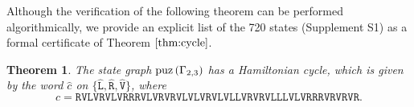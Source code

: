 \documentclass[lualatex,11pt]{article}
\newtheorem{thm}{Theorem}
\begin{document}
Although the verification of the following theorem
can be performed algorithmically,
we provide an explicit list of the 720 states (Supplement S1) 
as a formal certificate of Theorem $\ref{thm:cycle}$.
\begin{thm}
\label{thm:cycle}
 The state graph ${\rm puz}\left(\Gamma_{2,3}\right)$
 has a Hamiltonian cycle, which is given by the 
 word $\hat{c}$ on $\{\hat{{\mathtt L}}, \hat{{\mathtt R}}, \hat{{\mathtt V}}\}$, where
 \[
 c = \mathtt{R} \mathtt{V} \mathtt{L} \mathtt{V} \mathtt{R} \mathtt{V} \mathtt{L} \mathtt{V} \mathtt{R} \mathtt{R} \mathtt{R} \mathtt{V} \mathtt{L} \mathtt{V} \mathtt{R} \mathtt{V} \mathtt{R} \mathtt{V} \mathtt{L} \mathtt{V} \mathtt{L} \mathtt{V} \mathtt{R} \mathtt{V} \mathtt{L} \mathtt{V} \mathtt{L} \mathtt{L} \mathtt{V} \mathtt{R} \mathtt{V} \mathtt{R} \mathtt{V} \mathtt{L} \mathtt{L} \mathtt{L} \mathtt{V} \mathtt{L} \mathtt{V} \mathtt{R} \mathtt{R} \mathtt{R} \mathtt{V} \mathtt{R} \mathtt{V} \mathtt{R} \mathtt{V} \mathtt{R}.
 \]
\end{thm}
\end{document}
